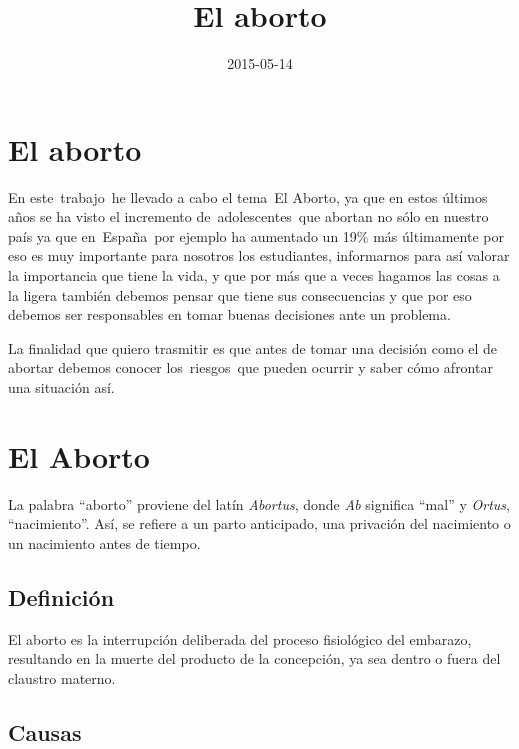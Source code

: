 \documentclass[
  jou,
  floatsintext,
  longtable,
  a4paper,
  nolmodern,
  notxfonts,
  notimes,
  12pt,
  colorlinks=true,linkcolor=blue,citecolor=blue,urlcolor=blue]{apa7}
\title{El aborto}
\date{2015-05-14}
\begin{document}
\maketitle


\hypertarget{toc}{}
\tableofcontents
\newpage
\section[Introduction]{El aborto}

\setcounter{secnumdepth}{3}

\setlength\LTleft{0pt}




En este~trabajo~he llevado a cabo el tema~El Aborto, ya que en estos
últimos años se ha visto el incremento de~adolescentes~que abortan no
sólo en nuestro país ya que en~España~por ejemplo ha aumentado un 19\%
más últimamente por eso es muy importante para nosotros los estudiantes,
informarnos para así valorar la importancia que tiene la vida, y que por
más que a veces hagamos las cosas a la ligera también debemos pensar que
tiene sus consecuencias y que por eso debemos ser responsables en tomar
buenas decisiones ante un problema.

La finalidad que quiero trasmitir es que antes de tomar una decisión
como el de abortar debemos conocer los~riesgos~que pueden ocurrir y
saber cómo afrontar una situación así.

\section{El Aborto}\label{el-aborto}

La palabra ``aborto'' proviene del latín \emph{Abortus}, donde \emph{Ab}
significa ``mal'' y \emph{Ortus}, ``nacimiento''. Así, se refiere a un
parto anticipado, una privación del nacimiento o un nacimiento antes de
tiempo.

\subsection{Definición}\label{definiciuxf3n}

El aborto es la interrupción deliberada del proceso fisiológico del
embarazo, resultando en la muerte del producto de la concepción, ya sea
dentro o fuera del claustro materno.

\subsection{Causas}\label{causas}
\end{document}
